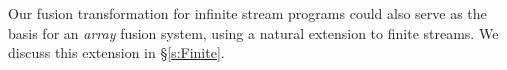 Our fusion transformation for infinite stream programs could also serve as the basis for an \emph{array} fusion system, using a natural extension to finite streams. We discuss this extension in \S\ref{s:Finite}.










